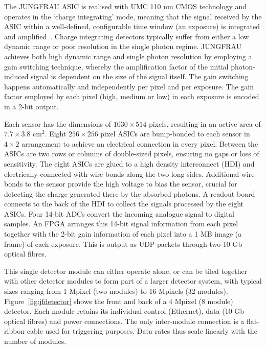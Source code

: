 \documentclass[a4paper]{article}
\begin{document}
The JUNGFRAU ASIC is realised with UMC 110 nm CMOS technology and operates in the `charge integrating' mode, meaning that the signal received by the ASIC within a well-defined, configurable time window (an exposure) is integrated and amplified~\cite{Mozzanica_2016}. Charge integrating detectors typically suffer from either a low dynamic range or poor resolution in the single photon regime. JUNGFRAU achieves both high dynamic range and single photon resolution by employing a gain switching technique, whereby the amplification factor of the initial photon-induced signal is dependent on the size of the signal itself. The gain switching happens automatically and independently per pixel and per exposure. The gain factor employed by each pixel (high, medium or low) in each exposure is encoded in a 2-bit output.

Each sensor has the dimensions of $1030\times514$ pixels, resulting in an active area of $7.7\times3.8$ cm$^2$. Eight $256 \times 256$ pixel ASICs are bump-bonded to each sensor in $4\times2$ arrangement to achieve an electrical connection in every pixel.  Between the ASICs are two rows or columns of double-sized pixels, ensuring no gaps or loss of sensitivity. The eight ASICs are glued to a high density interconnect (HDI) and electrically connected with wire-bonds along the two long sides. Additional wire-bonds to the sensor provide the high voltage to bias the sensor, crucial for detecting the charge generated there by the absorbed photons. A readout board connects to the back of the HDI to collect the signals processed by the eight ASICs. Four 14-bit ADCs convert the incoming analogue signal to digital samples. An FPGA arranges this 14-bit signal information from each pixel together with the 2-bit gain information of each pixel into a 1 MB image (a frame) of each exposure. This is output as UDP packets through two 10 Gb optical fibres.

This single detector module can either operate alone, or can be tiled together with other detector modules to form part of a larger detector system, with typical sizes ranging from 1 Mpixel (two modules) to 16 Mpixels (32 modules). Figure~\ref{fig:jfdetector} shows the front and back of a 4 Mpixel (8 module) detector. Each module retains its individual control (Ethernet), data (10 Gb optical fibres) and power connections. The only inter-module connection is a flat-ribbon cable used for triggering purposes. Data rates thus scale linearly with the number of modules.
\end{document}
